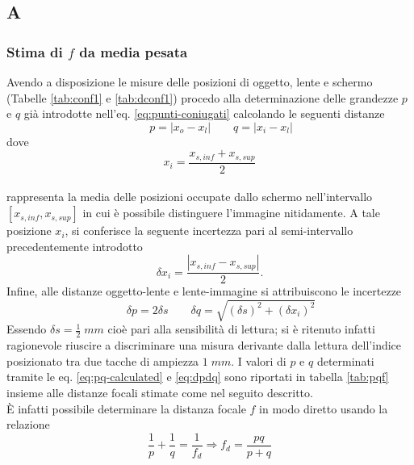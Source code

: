 \documentclass[11pt,a4paper]{article}
\begin{document}
\subsection{A}
\subsubsection{Stima di $f$ da media pesata}
Avendo a disposizione le misure delle posizioni di oggetto, lente e schermo (Tabelle \ref{tab:conf1} e \ref{tab:dconf1}) procedo alla determinazione delle grandezze $p$ e $q$ già introdotte nell'eq. \ref{eq:punti-coniugati} calcolando le seguenti distanze
\\
\begin{equation}
    \qquad{p = |x_o - x_l|}
    \qquad{q = |x_i - x_l|}
    \label{eq:pq-calculated}
\end{equation}
dove
\begin{equation}
    x_i = \frac{x_{s,inf} + x_{s,sup}}{2}
\end{equation}
\\
rappresenta la media delle posizioni occupate dallo schermo nell'intervallo $[x_{s,inf},x_{s,sup}]$ in cui è possibile distinguere l'immagine nitidamente. A tale posizione $x_i$, si conferisce la seguente incertezza pari al semi-intervallo precedentemente introdotto
\begin{equation}
    \delta x_i = \frac{|x_{s,inf} - x_{s,sup}|}{2}.
\end{equation}
Infine, alle distanze oggetto-lente e lente-immagine si attribuiscono le incertezze
\begin{equation}
    \qquad{\delta p = 2\delta s}
    \qquad{\delta q = \sqrt{(\delta s)^2 + (\delta x_i)^2}}
    \label{eq:dpdq}
\end{equation}
Essendo $\delta s = \frac{1}{2} \; mm$ cioè pari alla sensibilità di lettura; si è ritenuto infatti ragionevole riuscire a discriminare una misura derivante dalla lettura dell'indice posizionato tra due tacche di ampiezza $1 \; mm$. I valori di $p$ e $q$ determinati tramite le eq. \ref{eq:pq-calculated} e \ref{eq:dpdq} sono riportati in tabella \ref{tab:pqf} insieme alle distanze focali stimate come nel seguito descritto. 
\\
È infatti possibile determinare la distanza focale $f$ in modo diretto usando la relazione
\\
\begin{equation}
    \frac{1}{p}+\frac{1}{q}=\frac{1}{f_d} \Rightarrow f_d=\frac{p q}{p+q}
    \label{eq:f-direct}
\end{equation}
\end{document}
